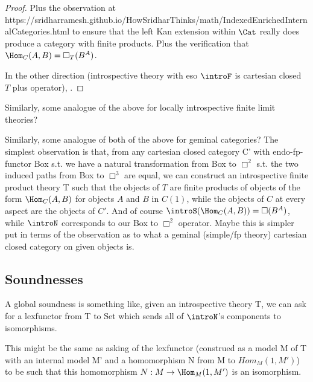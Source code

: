 \begin{proof}
Plus the observation at https://sridharramesh.github.io/HowSridharThinks/math/IndexedEnrichedInternalCategories.html to ensure that the left Kan extension within $\Cat$ really does produce a category with finite products. Plus the verification that $\Hom_C(A, B) = \Box_T (B^A)$.

In the other direction (introspective theory with eso $\introF$ is cartesian closed $T$ plus operator), \TODO.
\end{proof}
Similarly, some analogue of the above for locally introspective finite limit theories? \TODO

\begin{TODOblock}
Similarly, some analogue of both of the above for geminal categories? The simplest observation is that, from any cartesian closed category C' with endo-fp-functor Box s.t. we have a natural transformation from Box to $\Box^2$ s.t. the two induced paths from Box to $\Box^3$ are equal, we can construct an introspective finite product theory T such that the objects of $T$ are finite products of objects of the form $\Hom_C(A, B)$ for objects $A$ and $B$ in $C(1)$, while the objects of $C$ at every aspect are the objects of $C'$. And of course $\introS(\Hom_C(A, B)) = \Box(B^A)$, while $\introN$ corresponds to our Box to $\Box^2$ operator. Maybe this is simpler put in terms of the observation as to what a geminal (simple/fp theory) cartesian closed category on given objects is.
\end{TODOblock}

\subsection{Soundnesses}
\TODO

A global soundness is something like, given an introspective theory T, we can ask for a lexfunctor from T to Set which sends all of $\introN$'s components to isomorphisms.

This might be the same as asking of the lexfunctor (construed as a model M of T with an internal model M' and a homomorphism N from M to $Hom_M(1, M')$) to be such that this homomorphism $N : M \to \Hom_M(1, M')$ is an isomorphism.

\fileend